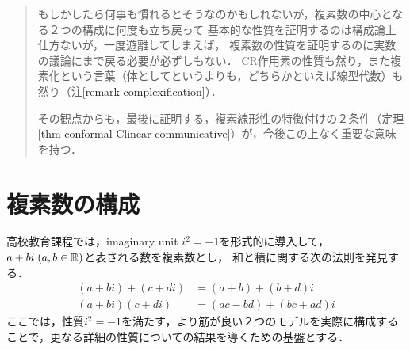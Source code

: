 \documentclass[uplatex, dvipdfmx]{jsreport}
\begin{document}
\begin{quotation}
    もしかしたら何事も慣れるとそうなのかもしれないが，複素数の中心となる２つの構成に何度も立ち戻って
    基本的な性質を証明するのは構成論上仕方ないが，一度遊離してしまえば，
    複素数の性質を証明するのに実数の議論にまで戻る必要が必ずしもない．
    CR作用素の性質も然り，また複素化という言葉（体としてというよりも，どちらかといえば線型代数）も然り（注\ref{remark-complexification}）．

    その観点からも，最後に証明する，複素線形性の特徴付けの２条件（定理\ref{thm-conformal-Clinear-communicative}）が，今後この上なく重要な意味を持つ．
\end{quotation}

\section{複素数の構成}

\begin{screen}
    高校教育課程では，imaginary unit $i^2=-1$を形式的に導入して，$a+bi\;(a,b\in\mathbb{R})$と表される数を複素数とし，
    和と積に関する次の法則を発見する．
    \begin{align}
        (a+bi) + (c+di) &= (a+b) + (b+d)i\\
        (a+bi)(c+di) &= (ac-bd) + (bc+ad)i
    \end{align}
    ここでは，性質$i^2=-1$を満たす，より筋が良い２つのモデルを実際に構成することで，更なる詳細の性質についての結果を導くための基盤とする．
\end{screen}
\end{document}
